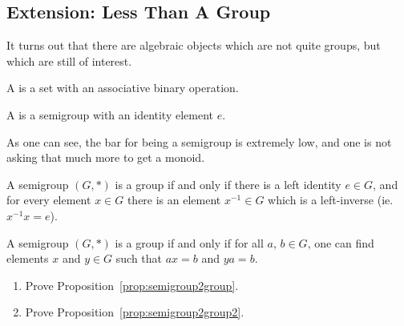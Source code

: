 
\subsection*{Extension: Less Than A Group}


It turns out that there are algebraic objects which are not quite 
groups, but which are still of interest.

\begin{definition}
  A  is a set with an associative binary 
  operation.
  
  A  is a semigroup with an identity element $e$.
\end{definition}

As one can see, the bar for being a semigroup is extremely low, and 
one is not asking that much more to get a monoid.

\begin{proposition}\label{prop:semigroup2group}
  A semigroup $(G, \ast)$ is a group if and only if there is a left 
  identity $e \in G$, and for every element $x \in G$ there is an 
  element $x^{-1} \in G$ which is a left-inverse (ie.\ $x^{-1}x = e$).
\end{proposition}

\begin{proposition}\label{prop:semigroup2group2}
    A semigroup $(G,\ast)$ is a group if and only if for all $a$, $b 
    \in G$, one can find elements $x$ and $y \in G$ such that $ax = 
    b$ and $ya = b$.
\end{proposition}

\begin{enumerate}
    \item Prove Proposition~\ref{prop:semigroup2group}.
    
    \item Prove Proposition~\ref{prop:semigroup2group2}.
\end{enumerate}

